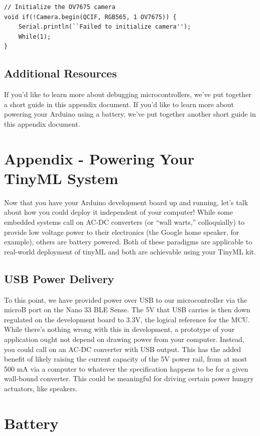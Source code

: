 \begin{lstlisting}
// Initialize the OV7675 camera
void if(!Camera.begin(QCIF, RGB565, 1 OV7675)) {
    Serial.println(``Failed to initialize camera'');
    While(1);   
}
\end{lstlisting}

\subsection{Additional Resources}
If you’d like to learn more about debugging microcontrollers, we’ve put together a short guide in this appendix document.
If you’d like to learn more about powering your Arduino using a battery, we’ve put together another short guide in this appendix document.


\section{Appendix - Powering Your TinyML System}

Now that you have your Arduino development board up and running, let's talk about how you could deploy it independent of your computer! While some embedded systems call on AC-DC converters (or “wall warts,” colloquially) to provide low voltage power to their electronics (the Google home speaker, for example), others are battery powered. Both of these paradigms are applicable to real-world deployment of tinyML and both are achievable using your TinyML kit.
    
\subsection{USB Power Delivery}

To this point, we have provided power over USB to our microcontroller via the microB port on the Nano 33 BLE Sense. The 5V that USB carries is then down regulated on the development board to 3.3V, the logical reference for the MCU. While there’s nothing wrong with this in development, a prototype of your application ought not depend on drawing power from your computer. Instead, you could call on an AC-DC converter with USB output. This has the added benefit of likely raising the current capacity of the 5V power rail, from at most 500 mA via a computer to whatever the specification happens to be for a given wall-bound converter. This could be meaningful for driving certain power hungry actuators, like speakers.
    
\section{Battery}

